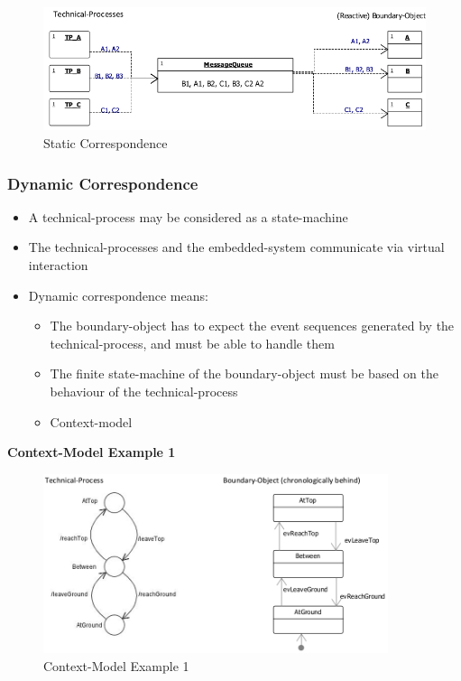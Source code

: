 \begin{figure}[H]
\centering
\includegraphics[width=1\textwidth]{figures/staticCorrespondence.png}
\caption{Static Correspondence}
\end{figure}

\clearpage
\hypertarget{dynamic-correspondence}{%
\subsubsection{Dynamic Correspondence}\label{dynamic-correspondence}}

\begin{itemize}
\tightlist
\item
  A technical-process may be considered as a state-machine
\item
  The technical-processes and the embedded-system communicate via
  virtual interaction
\item
  Dynamic correspondence means:

  \begin{itemize}
  \tightlist
  \item
    The boundary-object has to expect the event sequences generated by
    the technical-process, and must be able to handle them
  \item
    The finite state-machine of the boundary-object must be based on the
    behaviour of the technical-process
  \item
    Context-model
  \end{itemize}
\end{itemize}

\textbf{Context-Model Example 1}
\begin{figure}[H]
\centering
\includegraphics[width=0.9\textwidth]{figures/dynamicCorrespondence.png}
\caption{Context-Model Example 1}
\end{figure}

